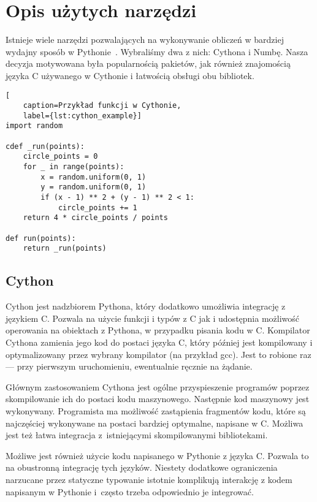 \section{Opis użytych narzędzi}

Istnieje wiele narzędzi pozwalających na wykonywanie obliczeń w bardziej
wydajny sposób w Pythonie~\cite{python_marowka}.
Wybraliśmy dwa z nich: Cythona i Numbę.
Nasza decyzja motywowana była popularnością pakietów,
jak również znajomością języka C używanego w Cythonie
i łatwością obsługi obu bibliotek.

\begin{lstlisting}[
    caption=Przykład funkcji w Cythonie,
    label={lst:cython_example}]
import random

cdef _run(points):
    circle_points = 0
    for _ in range(points):
        x = random.uniform(0, 1)
        y = random.uniform(0, 1)
        if (x - 1) ** 2 + (y - 1) ** 2 < 1:
            circle_points += 1
    return 4 * circle_points / points

def run(points):
    return _run(points)
\end{lstlisting}

\subsection{Cython}

Cython jest nadzbiorem Pythona, który dodatkowo umożliwia integrację
z językiem C\@.
Pozwala na użycie funkcji i typów z C jak i udostępnia
możliwość operowania na obiektach z Pythona, w przypadku
pisania kodu w C\@.
Kompilator Cythona zamienia jego kod do postaci języka C,
który później jest kompilowany i optymalizowany
przez wybrany kompilator (na przykład gcc).
Jest to robione raz --- przy pierwszym uruchomieniu,
ewentualnie ręcznie na żądanie.

Głównym zastosowaniem Cythona jest ogólne przyspieszenie programów
poprzez skompilowanie ich do postaci kodu maszynowego.
Następnie kod maszynowy jest wykonywany.
Programista ma możliwość zastąpienia fragmentów kodu, które
są najczęściej wykonywane na postaci bardziej optymalne,
napisane w C\@.
Możliwa jest też łatwa integracja z~istniejącymi skompilowanymi
bibliotekami.

Możliwe jest również użycie kodu napisanego w Pythonie z języka C\@.
Pozwala to na obustronną integrację tych języków.
Niestety dodatkowe ograniczenia narzucane przez statyczne typowanie
istotnie komplikują interakcję z kodem napisanym w Pythonie
i~często trzeba odpowiednio je integrować.

